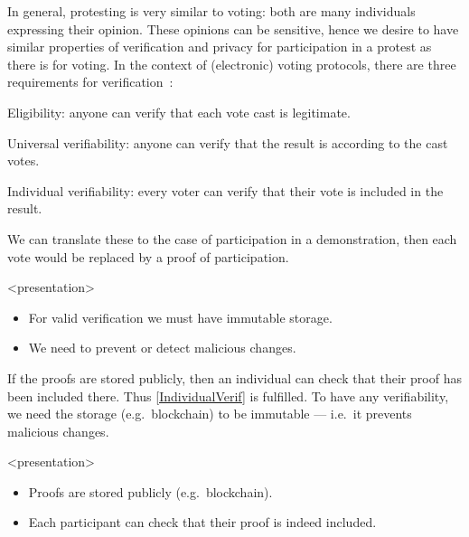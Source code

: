 In general, protesting is very similar to voting: both are many individuals 
expressing their opinion.
These opinions can be sensitive, hence we desire to have similar properties of 
verification and privacy for participation in a protest as there is for voting.
In the context of (electronic) voting protocols, there are three requirements 
for verification~\cite{VerifyingPrivacyPropertiesOfVotingProtocols}:
\begin{frame}
\begin{requirements}[V]
\item\label{EligibilityVerif} Eligibility: anyone can verify that each vote 
  cast is legitimate.
\item\label{UniversalVerif} Universal verifiability: anyone can verify that the 
  result is according to the cast votes.
\item\label{IndividualVerif} Individual verifiability: every voter can verify 
  that their vote is included in the result.
\end{requirements}
\end{frame}
We can translate these to the case of participation in a demonstration, then 
each vote would be replaced by a proof of participation.

\begin{frame}<presentation>
  \begin{remark}
    \begin{itemize}
      \item For valid verification we must have immutable storage.
      \item We need to prevent or detect malicious changes.
    \end{itemize}
  \end{remark}
\end{frame}

If the proofs are stored publicly, then an individual can check that their 
proof has been included there.
Thus \cref{IndividualVerif} is fulfilled.
To have any verifiability, we need the storage (e.g.\ blockchain) to be 
immutable --- i.e.\ it prevents malicious changes.

\begin{frame}<presentation>
  \begin{idea}
    \begin{itemize}
      \item Proofs are stored publicly (e.g.\ blockchain).
      \item Each participant can check that their proof is indeed included.
    \end{itemize}
  \end{idea}
\end{frame}


